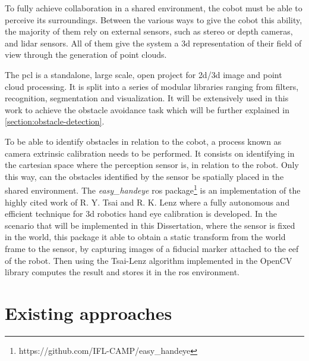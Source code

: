 \par To fully achieve collaboration in a shared environment, the cobot must be able to perceive its surroundings. Between the various ways to give the cobot this ability, the majority of them rely on external sensors, such as stereo or depth cameras, and lidar sensors. All of them give the system a \acs{3d} representation of their field of view through the generation of point clouds.
\par The \ac{pcl} \cite{pcl} is a standalone, large scale, open project for \acs{2d}/\acs{3d} image and point cloud processing. It is split into a series of modular libraries ranging from filters, recognition, segmentation and visualization. It will be extensively used in this work to achieve the obstacle avoidance task which will be further explained in \autoref{section:obstacle-detection}.
\par To be able to identify obstacles in relation to the cobot, a process known as camera extrinsic calibration needs to be performed. It consists on identifying in the cartesian space where the perception sensor is, in relation to the robot. Only this way, can the obstacles identified by the sensor be spatially placed in the shared environment. The \textit{easy\_handeye} \ac{ros} package\footnote{https://github.com/IFL-CAMP/easy\_handeye} is an implementation of the highly cited work of R. Y. Tsai and R. K. Lenz \cite{handeye} where a fully autonomous and efficient technique for \acs{3d} robotics hand eye calibration is developed. In the scenario that will be implemented in this Dissertation, where the sensor is fixed in the world, this package it able to obtain a static transform from the world frame to the sensor, by capturing images of a fiducial marker attached to the \ac{eef} of the robot. Then using the Tsai-Lenz algorithm implemented in the OpenCV library computes the result and stores it in the \ac{ros} environment.


\section{Existing approaches}

